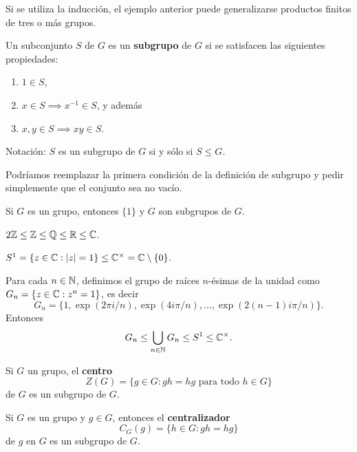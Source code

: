 Si se utiliza la inducción, el ejemplo anterior puede generalizarse productos finitos de tres o más grupos. 

\begin{definition}
	Un subconjunto $S$ de $G$ es un \textbf{subgrupo} de $G$ si se satisfacen
	las siguientes propiedades:
	\begin{enumerate}
		\item $1\in S$, 
		\item $x\in S\implies x^{-1}\in S$, y además 
		\item $x,y\in S\implies xy\in S$.
	\end{enumerate}
	Notación: $S$ es un subgrupo de $G$ si y sólo si $S\leq G$. 
\end{definition}

Podríamos reemplazar la primera condición de la definición de subgrupo y pedir
simplemente que el conjunto sea no vacío. 

\begin{example}
	Si $G$ es un grupo, entonces $\{1\}$ y $G$ son subgrupos de $G$. 
\end{example}

\begin{example}
$2\mathbb{Z}\leq\mathbb{Z}\leq\mathbb{Q}\leq\mathbb{R}\leq\mathbb{C}$. 	
\end{example}

\begin{example}
$S^1=\{z\in\mathbb{C}:|z|=1\}\leq\mathbb{C}^\times=\mathbb{C}\setminus\{0\}$.
\end{example}

\begin{example}
Para cada $n\in\mathbb{N}$, definimos el grupo de raíces $n$-ésimas de la unidad como $G_n=\{z\in\mathbb{C}:z^n=1\}$, es decir 
\[
G_n=\{1,\exp(2\pi i/n),\exp(4i\pi/n),\dots,\exp(2(n-1)i\pi/n)\}.
\]
Entonces
\[
G_n\leq\bigcup_{n\in\mathbb{N}}G_n\leq S^1\leq\mathbb{C}^\times.
\]
\end{example}

\begin{exercise}
	Si $G$ un grupo, el \textbf{centro} 
	\[
		Z(G)=\{g\in G:gh=hg\text{ para todo	$h\in G$}\}
	\]
	de $G$ es un subgrupo de $G$.
\end{exercise}

\begin{exercise}
	Si $G$ es un grupo y $g\in G$, entonces el \textbf{centralizador} 
	\[
		C_G(g)=\{h\in G:gh=hg\} 
	\]
	de $g$ en $G$ es un subgrupo de $G$.
\end{exercise}

